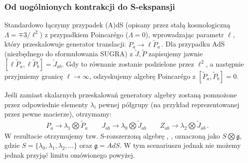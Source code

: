 \documentclass[12pt,a4paper]{article}
\begin{document}
\subsubsection{Od uogólnionych kontrakcji do S-ekspansji}

Standardowo łączymy przypadek (A)dS (opisany przez stałą kosmologiczną $\Lambda=\mp 3/\ell^2$) z przypadkiem Poincar\'{e}go ($\Lambda=0$), wprowadzając parametr $\ell$, który przeskalowuje generator translacji:
$P_{a} \to \ell \tilde{P}_{a}\,$. Dla przypadku AdS (niezbędnego do sformułowania SUGRA) z $\tilde{J},\tilde{P}$ zapisujemy jawnie $[\ell \tilde{P}_a, \ell \tilde{P}_b]=\tilde{J}_{ab}$. Gdy to równanie zostanie podzielone przez $\ell^2$, a następnie przyjmiemy granicę $\ell \to \infty$, odzyskujemy algebrę Poincar\'{e}go z $[\tilde{P}_a,\tilde{P}_b]=0$.

Jeśli zamiast skalarnych przeskalowań generatory algebry zostaną pomnożone przez odpowiednie elementy $\lambda_i$ pewnej półgrupy (na przykład reprezentowanej przez pewne macierze), otrzymamy:
\begin{align}
	P_{a} \to \lambda_1 \bigotimes \tilde{P}_{a}\qquad J_{ab} \to \lambda_0 \bigotimes \tilde{J}_{ab} \qquad Z_{ab} \to \lambda_2 \bigotimes \tilde{J}_{ab}\,.
\end{align}
W rezultacie otrzymujemy tzw. S-rozszerzoną algebrę \cite{Izaurieta:2006zz}, \cite{Andrianopoli:2013ooa}, oznaczoną jako $S \bigotimes \mathfrak{g}$, gdzie $S=\{\lambda_0,\lambda_1,\lambda_2,\ldots\}$ oraz $\mathfrak{g}=AdS$. W tym scenariuszu jednak nie możemy jednak przyjąć limitu omówionego powyżej.
\end{document}
